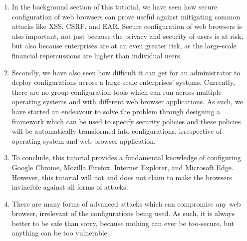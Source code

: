 \documentclass[12pt]{extarticle}
\begin{document}
	
	
	\vspace{2mm}
	\begin{enumerate}
		
		\item	In the background section of this tutorial, we have seen how secure configuration of web browsers can prove useful against mitigating common attacks like XSS, CSRF, and EAR. Secure configuration of web browsers is also important, not just because the privacy and security of users is at risk, but also because enterprises are at an even greater risk, as the large-scale financial repercussions are higher than individual users.
		
		\item	Secondly, we have also seen how difficult it can get for an administrator to deploy configurations across a large-scale enterprises' systems. Currently, there are no group-configuration tools which can run across multiple operating systems and with different web browser applications. As such, we have started an endeavour to solve the problem through designing a framework which can be used to specify security policies and these policies will be automatically transformed into configurations, irrespective of operating system and web browser application.
		
		
		\item	To conclude, this tutorial provides a fundamental knowledge of configuring Google Chrome, Mozilla Firefox, Internet Explorer, and Microsoft Edge. However, this tutorial will not and does not claim to make the browsers invincible against all forms of attacks. 
		
		\item There are many forms of advanced attacks which can compromise any web browser, irrelevant of the configurations being used. As such, it is always better to be safe than sorry, because nothing can ever be too-secure, but anything can be too vulnerable.
	\end{enumerate}
	
	
	
	
\end{document}
